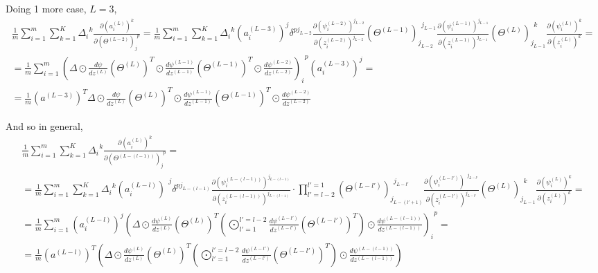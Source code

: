 \documentclass[10pt]{amsart}
\begin{document}
\begin{multicols*}{2}
Doing 1 more case, $L=3$, 
\[
\begin{gathered}
\frac{1}{m} \sum_{i=1}^m \sum_{k=1}^K \Delta_i^{\  \  k} \frac{ \partial (a_i^{(L)})^k }{ \partial ( \Theta^{(L-2)})_j^{\  \  p} } = \frac{1}{m} \sum_{i=1}^m \sum_{k=1}^K \Delta_i^{\  \  k}   (a^{(L-3)}_i)^j \delta^{pj_{L-2}} \frac{\partial (\psi_i^{(L-2)})^{j_{L-2}}}{\partial (z_i^{(L-2)})^{j_{L-2}} } (\Theta^{(L-1)})_{j_{L-2}}^{\  \  j_{L-1}} \frac{ \partial (\psi_i^{(L-1)})^{j_{L-1} }}{ \partial (z_i^{(L-1)})^{j_{L-1} } } (\Theta^{(L)})_{j_{L-1}}^{\  \  k} \frac{ \partial (\psi_i^{(L)})^k }{ \partial (z_i^{(L)})^k } = \\
= \frac{1}{m} \sum_{i=1}^m \left( \Delta \odot \frac{d\psi}{dz^{(L)}} (\Theta^{(L)})^T \odot \frac{d\psi^{(L-1)} }{ dz^{(L-1)}} (\Theta^{(L-1)} )^T \odot \frac{d\psi^{(L-2)} }{ dz^{(L-2)}} \right)_i^{\  \  p} (a_i^{(L-3)} )^j = \\
= \frac{1}{m} (a^{(L-3)})^T \Delta \odot \frac{d\psi }{dz^{(L)}} (\Theta^{(L)})^T \odot \frac{d\psi^{(L-1)} }{ dz^{(L-1)}} (\Theta^{(L-1)})^T \odot \frac{d\psi^{(L-2)} }{dz^{(L-2)}}
\end{gathered}\]

And so in general, 
\begin{equation}
\begin{gathered}
	\frac{1}{m} \sum_{i=1}^m \sum_{k=1}^K \Delta_i^{\  \  k} \frac{\partial (a_i^{(L)})^k }{ \partial (\Theta^{(L-(l-1))})_j^{\  \  p} } =  \\
	= \frac{1}{m} \sum_{i=1}^m \sum_{k=1}^K \Delta_i^{\  \  k}  (a_i^{(L-l)})^{\  \  j} \delta^{pj_{L-(l-1)} }   \frac{ \partial (\psi_i^{(L-(l-1))})^{j_{L-(l-1)} } }{ \partial (z_i^{(L-(l-1))})^{j_{L-(l-1)} } } 	\cdot \prod_{l' = l-2}^{l'=1} (\Theta^{(L-l')})_{ j_{L-(l'+1)}}^{\  \  j_{L-l'}}      \frac{ \partial (\psi_i^{(L-l')})^{\  \  j_{L-l'} } }{ \partial (z_i^{(L-l')})^{ j_{L-l'}} } (\Theta^{(L)})_{ j_{L-1}}^{\  \  k}      \frac{ \partial (\psi_i^{(L)})^{ k } }{ \partial (z_i^{(L)})^{  k} } = \\
	= \frac{1}{m} \sum_{i=1}^m (a_i^{(L-l)})^j \left( \Delta \odot \frac{d\psi^{(L)} }{ dz^{(L)}} (\Theta^{(L)})^T \left( \bigodot_{l'=1}^{l'=l-2} \frac{d\psi^{(L-l')} }{ dz^{(L-l')}} (\Theta^{(L-l')})^T \right) \odot \frac{d\psi^{ (L-(l-1))} }{ dz^{(L-(l-1))}} \right)_i^{\  \  p} = \\
	=\boxed{ \frac{1}{m} (a^{(L-l)})^T  \left( \Delta \odot \frac{d\psi^{(L)} }{ dz^{(L)}} (\Theta^{(L)})^T \left( \bigodot_{l'=1}^{l'=l-2} \frac{d\psi^{(L-l')} }{ dz^{(L-l')}} (\Theta^{(L-l')})^T \right) \odot \frac{d\psi^{ (L-(l-1))} }{ dz^{(L-(l-1))}} \right)  
	}
\end{gathered}
\end{equation}


\end{multicols*}
\end{document}
